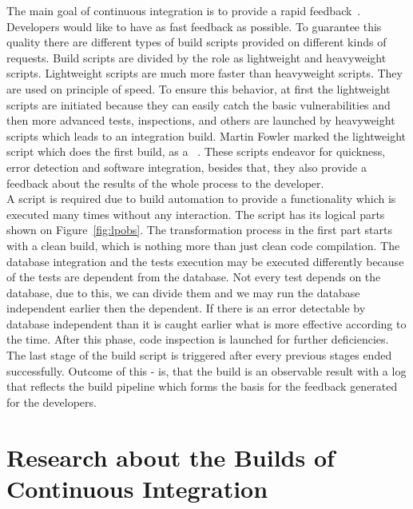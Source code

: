 The main goal of continuous integration is to provide a rapid feedback~\cite{MartinFowler}. Developers would like to have as fast feedback as possible. To guarantee this quality there are different types of build scripts provided on different kinds of requests. Build scripts are divided by the role as lightweight and heavyweight scripts. Lightweight scripts are much more faster than heavyweight scripts. They are used on principle of speed. To ensure this behavior, at first the lightweight scripts are initiated because they can easily catch the basic vulnerabilities and then more advanced tests, inspections, and others are launched by heavyweight scripts which leads to an integration build. Martin Fowler marked the lightweight script which does the first build, as a ~\cite{MartinFowler}. These scripts endeavor for quickness, error detection and software integration, besides that, they also provide a feedback about the results of the whole process to the developer.\\

A script is required due to build automation to provide a  functionality which is executed many times without any interaction. The script has its logical parts shown on Figure~\ref{fig:lpobs}. The transformation process in the first part starts with a clean build, which is nothing more than just clean code compilation. The database integration and the tests execution may be executed differently because of the tests are dependent from the database. Not every test depends on the database, due to this, we can divide them and we may run the database independent earlier then the dependent. If there is an error detectable by database independent than it is caught earlier what is more effective according to the time. After this phase, code inspection is launched for further deficiencies. The last stage of the build script is triggered after every previous stages ended successfully. Outcome of this - is, that the build is an observable result with a log that reflects the build pipeline which forms the basis for the feedback generated for the developers.

\section{Research about the Builds of Continuous Integration}

